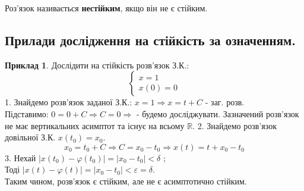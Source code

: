 \documentclass[14pt,a4paper]{scrartcl}
\theoremstyle{definition}
\newtheorem*{example}{Приклад}
\theoremstyle{remark}
\theoremstyle{definition}
\theoremstyle{definition}
\begin{document}
\def\vx{\vec{x}}
\def\vphi{\vec{\varphi}}
\def\vf{\vec{f}}

\bd
Роз'язок називається \textbf{нестійким}, якщо він не є стійким.
\ed

\subsection{Прилади дослідження на стійкість за означенням.}

\begin{example}
    Дослідити на стійкість розв'язок З.К.:
$$
\begin{cases}
    x = 1 \\
    x(0) = 0
\end{cases}
$$
1. Знайдемо розв'язок заданої З.К.: $x = 1 \Rightarrow x = t + C$ - заг. розв.\\
Підставимо: $ 0 = 0 + C \Longrightarrow C = 0 \Longrightarrow $  - будемо досліджувати.
Зазначений розв'язок не має вертикальних асимптот та існує на всьому $\mathbb{R}$.
2. Знайдемо розв'язок довільної З.К. $x(t_0) = x_0$.
$$
x_0 = t_0 + C \Rightarrow C = x_0 - t_0 \Rightarrow x(t) = t + x_0 - t_0
$$
3. Нехай $  \left| x(t_0) - \varphi(t_0) \right|  =  \left| x_0 - t_0 \right| < \delta  $ ;\\
Тоді $ \left| x (t) - \varphi (t) \right|  = \left|  x_0 - t_0 \right| < \varepsilon = \delta $.\\
Таким чином, розв'язок є стійким, але не є асимптотично стійким.

\end{example}
\end{document}
